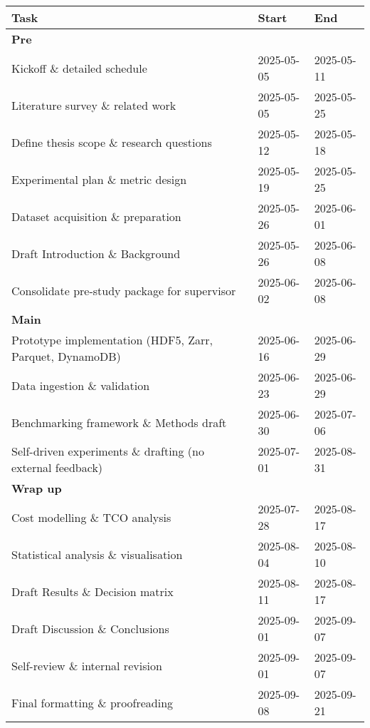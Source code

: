 \documentclass{article}
\begin{document}
\begin{center}
    \begingroup
        \setlength{\tabcolsep}{8pt}
        \small
        \begin{tabular}{@{}lll@{}}
            \toprule
            \textbf{Task} & \textbf{Start} & \textbf{End} \\
            \midrule
            \multicolumn{3}{l}{\textbf{Pre}} \\
            Kickoff \& detailed schedule & 2025-05-05 & 2025-05-11 \\
            Literature survey \& related work & 2025-05-05 & 2025-05-25 \\
            Define thesis scope \& research questions & 2025-05-12 & 2025-05-18 \\
            Experimental plan \& metric design & 2025-05-19 & 2025-05-25 \\
            Dataset acquisition \& preparation & 2025-05-26 & 2025-06-01 \\
            Draft Introduction \& Background & 2025-05-26 & 2025-06-08 \\
            Consolidate pre-study package for supervisor & 2025-06-02 & 2025-06-08 \\
            \midrule
            \multicolumn{3}{l}{\textbf{Main}} \\
            Prototype implementation (HDF5, Zarr, Parquet, DynamoDB) & 2025-06-16 & 2025-06-29 \\
            Data ingestion \& validation & 2025-06-23 & 2025-06-29 \\
            Benchmarking framework \& Methods draft & 2025-06-30 & 2025-07-06 \\
            Self-driven experiments \& drafting (no external feedback) & 2025-07-01 & 2025-08-31 \\
            \midrule
            \multicolumn{3}{l}{\textbf{Wrap up}} \\
            Cost modelling \& TCO analysis & 2025-07-28 & 2025-08-17 \\
            Statistical analysis \& visualisation & 2025-08-04 & 2025-08-10 \\
            Draft Results \& Decision matrix & 2025-08-11 & 2025-08-17 \\
            Draft Discussion \& Conclusions & 2025-09-01 & 2025-09-07 \\
            Self-review \& internal revision & 2025-09-01 & 2025-09-07 \\
            Final formatting \& proofreading & 2025-09-08 & 2025-09-21 \\
            \bottomrule
        \end{tabular}
    \endgroup
\end{center}



\printbibliography
\end{document}
